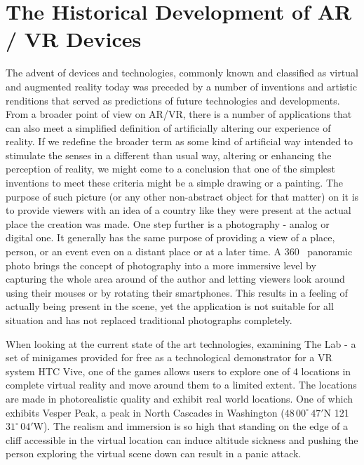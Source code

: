 \documentclass[12pt, a4paper]{article}
\def\nswe#1#2#3{#1\,$#2^\circ\,#3'$}
\begin{document}
\section{The Historical Development of AR / VR Devices}
The advent of devices and technologies, commonly known and classified as virtual and augmented reality today was preceded by a number of inventions and artistic renditions that served as predictions of future technologies and developments. From a broader point of view on AR/VR, there is a number of applications that can also meet a simplified definition of artificially altering our experience of reality. If we redefine the broader term as some kind of artificial way intended to stimulate the senses in a different than usual way, altering or enhancing the perception of reality, we might come to a conclusion that one of the simplest inventions to meet these criteria might be a simple drawing or a painting. The purpose of such picture (or any other non-abstract object for that matter) on it is to provide viewers with an idea of a country like they were present at the actual place the creation was made. One step further is a photography - analog or digital one. It generally has the same purpose of providing a view of a place, person, or an event even on a distant place or at a later time. A 360\degree~ panoramic photo brings the concept of photography into a more immersive level by capturing the whole area around of the author and letting viewers look around using their mouses or by rotating their smartphones. This results in a feeling of actually being present in the scene, yet the application is not suitable for all situation and has not replaced traditional photographs completely.
 
When looking at the current state of the art technologies, examining The Lab - a set of minigames provided for free as a technological demonstrator for a VR system HTC Vive, one of the games allows users to explore one of 4 locations in complete virtual reality and move around them to a limited extent. The locations are made in photorealistic quality and exhibit real world locations. One of which exhibits Vesper Peak, a peak in North Cascades in Washington (\nswe{48}{00}{47}N \nswe{121}{31}{04}W). The realism and immersion is so high that standing on the edge of a cliff accessible in the virtual location can induce altitude sickness and pushing the person exploring the virtual scene down can result in a panic attack.

\end{document}
